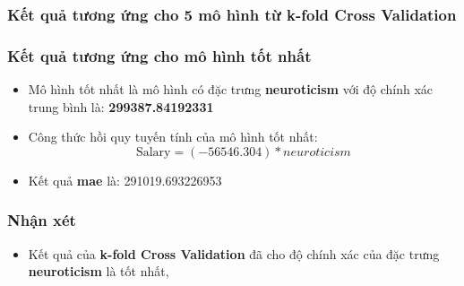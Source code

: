 \documentclass{report}
\begin{document}
        \subsubsection{Kết quả tương ứng cho 5 mô hình từ k-fold Cross Validation}

    \begin{table}[H]
        \centering
    \end{table}

    \subsubsection{Kết quả tương ứng cho mô hình tốt nhất}
    \begin{itemize}
        \item Mô hình tốt nhất là mô hình có đặc trưng \textbf{neuroticism} với độ chính xác trung bình là: \textbf{299387.84192331}
        \item Công thức hồi quy tuyến tính của mô hình tốt nhất: 
        \begin{equation}
            \text{Salary} = (-56546.304)*neuroticism
        \end{equation}
        \item Kết quả \textbf{mae} là: 291019.693226953
    \end{itemize}

    \subsubsection{Nhận xét}
    \begin{itemize}
        \item Kết quả của \textbf{k-fold Cross Validation} đã cho độ chính xác của đặc trưng \textbf{neuroticism} là tốt nhất,
    \end{itemize}
\end{document}

